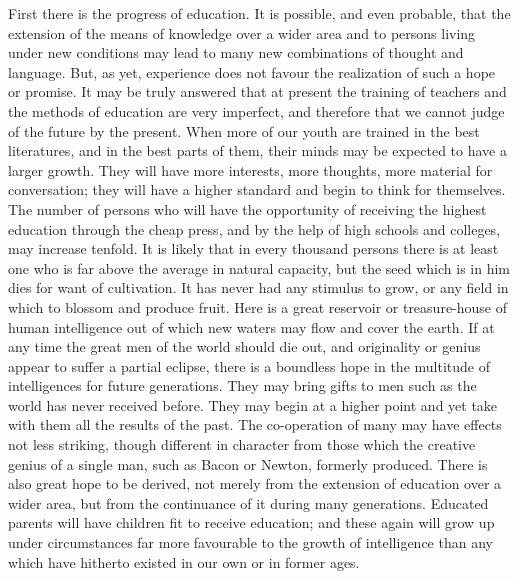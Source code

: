\documentclass[11pt,letter]{article}
\begin{document}
\par  First there is the progress of education. It is possible, and even probable, that the extension of the means of knowledge over a wider area and to persons living under new conditions may lead to many new combinations of thought and language. But, as yet, experience does not favour the realization of such a hope or promise. It may be truly answered that at present the training of teachers and the methods of education are very imperfect, and therefore that we cannot judge of the future by the present. When more of our youth are trained in the best literatures, and in the best parts of them, their minds may be expected to have a larger growth. They will have more interests, more thoughts, more material for conversation; they will have a higher standard and begin to think for themselves. The number of persons who will have the opportunity of receiving the highest education through the cheap press, and by the help of high schools and colleges, may increase tenfold. It is likely that in every thousand persons there is at least one who is far above the average in natural capacity, but the seed which is in him dies for want of cultivation. It has never had any stimulus to grow, or any field in which to blossom and produce fruit. Here is a great reservoir or treasure-house of human intelligence out of which new waters may flow and cover the earth. If at any time the great men of the world should die out, and originality or genius appear to suffer a partial eclipse, there is a boundless hope in the multitude of intelligences for future generations. They may bring gifts to men such as the world has never received before. They may begin at a higher point and yet take with them all the results of the past. The co-operation of many may have effects not less striking, though different in character from those which the creative genius of a single man, such as Bacon or Newton, formerly produced. There is also great hope to be derived, not merely from the extension of education over a wider area, but from the continuance of it during many generations. Educated parents will have children fit to receive education; and these again will grow up under circumstances far more favourable to the growth of intelligence than any which have hitherto existed in our own or in former ages.
\end{document}
